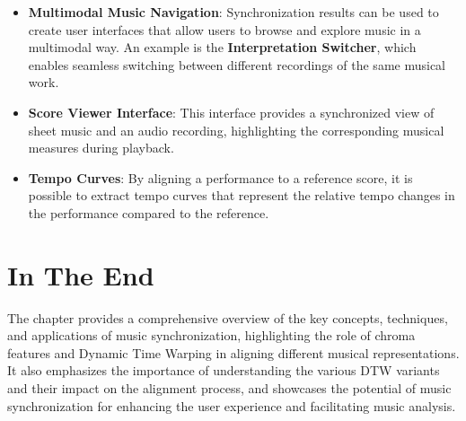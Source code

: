 \documentclass[a4paper, 9pt, twocolumn]{extarticle}
\begin{document}
    \begin{itemize}
    \item
      \textbf{Multimodal Music Navigation}: Synchronization results can be
      used to create user interfaces that allow users to browse and explore
      music in a multimodal way. An example is the \textbf{Interpretation
      Switcher}, which enables seamless switching between different
      recordings of the same musical work.
    \item
      \textbf{Score Viewer Interface}: This interface provides a
      synchronized view of sheet music and an audio recording, highlighting
      the corresponding musical measures during playback.
    \item
      \textbf{Tempo Curves}: By aligning a performance to a reference score,
      it is possible to extract tempo curves that represent the relative
      tempo changes in the performance compared to the reference.
    \end{itemize}
    \section{In The End}
    The chapter provides a comprehensive overview of the key
    concepts, techniques, and applications of music synchronization,
    highlighting the role of chroma features and Dynamic Time Warping in
    aligning different musical representations. It also emphasizes the
    importance of understanding the various DTW variants and their impact on
    the alignment process, and showcases the potential of music
    synchronization for enhancing the user experience and facilitating music
    analysis.
\end{document}
